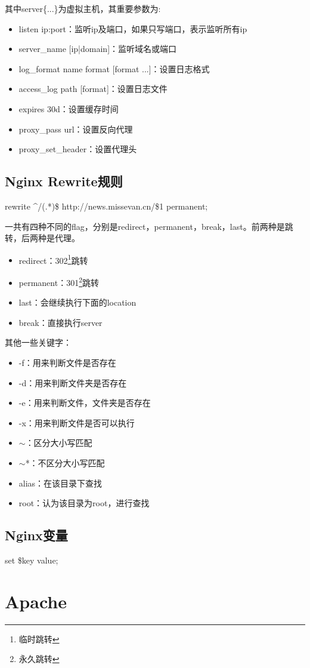 \documentclass[UTF8]{ctexart}
\begin{document}
其中server\{...\}为虚拟主机，其重要参数为:

\begin{itemize}
  \item listen ip:port：监听ip及端口，如果只写端口，表示监听所有ip
  \item server\_name [ip|domain]：监听域名或端口
  \item log\_format name format [format ...]：设置日志格式
  \item access\_log path [format]：设置日志文件
  \item expires 30d：设置缓存时间
  \item proxy\_pass url：设置反向代理
  \item proxy\_set\_header：设置代理头
\end{itemize}

\subsection{Nginx Rewrite规则}
rewrite \^{}/(.*)\$ http://news.missevan.cn/\$1 permanent;

一共有四种不同的flag，分别是redirect，permanent，break，last。前两种是跳转，后两种是代理。
\begin{itemize}
  \item redirect：302\footnote{临时跳转}跳转
  \item permanent：301\footnote{永久跳转}跳转
  \item last：会继续执行下面的location
  \item break：直接执行server
\end{itemize}

其他一些关键字：
\begin{itemize}
  \item -f：用来判断文件是否存在
  \item -d：用来判断文件夹是否存在
  \item -e：用来判断文件，文件夹是否存在
  \item -x：用来判断文件是否可以执行
  \item $\sim$：区分大小写匹配
  \item $\sim$*：不区分大小写匹配
  \item alias：在该目录下查找
  \item root：认为该目录为root，进行查找
\end{itemize}

\subsection{Nginx变量}
set \$key value;
\clearpage

\section{Apache}
\end{document}
